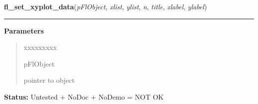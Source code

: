    \label{xformslib:flxyplot:fl_set_xyplot_data}

    \vspace{0.5ex}

\hspace{.8\funcindent}\begin{boxedminipage}{\funcwidth}

    \raggedright \textbf{fl\_set\_xyplot\_data}(\textit{pFlObject}, \textit{xlist}, \textit{ylist}, \textit{n}, \textit{title}, \textit{xlabel}, \textit{ylabel})

    \vspace{-1.5ex}

    \rule{\textwidth}{0.5\fboxrule}
\setlength{\parskip}{2ex}
\setlength{\parskip}{1ex}
      \textbf{Parameters}
      \vspace{-1ex}

      \begin{quote}
        \begin{Ventry}{xxxxxxxxx}

          \item[pFlObject]

          pointer to object

        \end{Ventry}

      \end{quote}

\textbf{Status:} Untested + NoDoc + NoDemo = NOT OK



    \end{boxedminipage}

    \label{xformslib:flxyplot:fl_set_xyplot_data_double}

    \vspace{0.5ex}

